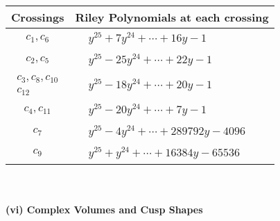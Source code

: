 \documentclass[1p]{elsarticle_modified}
\theoremstyle{definition}
\begin{document}
\begin{tabular}{m{50pt}|m{274pt}}
Crossings & \hspace{64pt}Riley Polynomials at each crossing \\
\hline $$\begin{aligned}c_{1},c_{6}\end{aligned}$$&$\begin{aligned}
&y^{25}+7 y^{24}+\cdots+16 y-1
\end{aligned}$\\
\hline $$\begin{aligned}c_{2},c_{5}\end{aligned}$$&$\begin{aligned}
&y^{25}-25 y^{24}+\cdots+22 y-1
\end{aligned}$\\
\hline $$\begin{aligned}c_{3},c_{8},c_{10}\\c_{12}\end{aligned}$$&$\begin{aligned}
&y^{25}-18 y^{24}+\cdots+20 y-1
\end{aligned}$\\
\hline $$\begin{aligned}c_{4},c_{11}\end{aligned}$$&$\begin{aligned}
&y^{25}-20 y^{24}+\cdots+7 y-1
\end{aligned}$\\
\hline $$\begin{aligned}c_{7}\end{aligned}$$&$\begin{aligned}
&y^{25}-4 y^{24}+\cdots+289792 y-4096
\end{aligned}$\\
\hline $$\begin{aligned}c_{9}\end{aligned}$$&$\begin{aligned}
&y^{25}+y^{24}+\cdots+16384 y-65536
\end{aligned}$\\
\hline
\end{tabular}\\~\\
\newpage\flushleft \textbf{(vi) Complex Volumes and Cusp Shapes}
\end{document}
